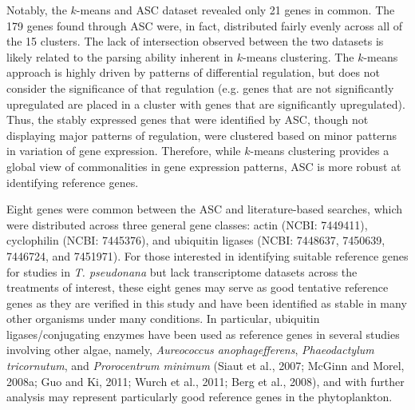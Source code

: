 	Notably, the $k$-means and ASC dataset revealed only 21 genes in common. The 179 genes found through ASC were, in fact, distributed fairly evenly across all of the 15 clusters. The lack of intersection observed between the two datasets is likely related to the parsing ability inherent in $k$-means clustering. The $k$-means approach is highly driven by patterns of differential regulation, but does not consider the significance of that regulation (e.g. genes that are not significantly upregulated are placed in a cluster with genes that are significantly upregulated). Thus, the stably expressed genes that were identified by ASC, though not displaying major patterns of regulation, were clustered based on minor patterns in variation of gene expression. Therefore, while $k$-means clustering provides a global view of commonalities in gene expression patterns, ASC is more robust at identifying reference genes.\par
	Eight genes were common between the ASC and literature-based searches, which were distributed across three general gene classes: actin (NCBI: 7449411), cyclophilin (NCBI: 7445376), and ubiquitin ligases (NCBI: 7448637, 7450639, 7446724, and 7451971). For those interested in identifying suitable reference genes for studies in \textit{T. pseudonana} but lack transcriptome datasets across the treatments of interest, these eight genes may serve as good tentative reference genes as they are verified in this study and have been identified as stable in many other organisms under many conditions. In particular, ubiquitin ligases/conjugating enzymes have been used as reference genes in several studies involving other algae, namely, \textit{Aureococcus anophagefferens}, \textit{Phaeodactylum tricornutum}, and \textit{Prorocentrum minimum} (Siaut et al., 2007; McGinn and Morel, 2008a; Guo and Ki, 2011; Wurch et al., 2011; Berg et al., 2008), and with further analysis may represent particularly good reference genes in the phytoplankton. \par
